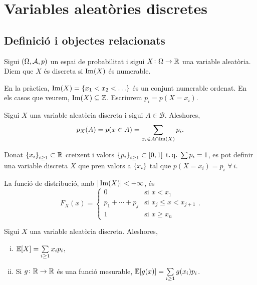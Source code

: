 \chapter{Variables aleatòries discretes}

\section{Definició i objectes relacionats}

\begin{defi}
    Sigui $\left( \Omega, \mathcal{A}, p\right)$ un espai de probabilitat i sigui $X\colon \Omega\to\mathbb{R}$ una variable aleatòria. Diem que $X$ és discreta si
    $\operatorname{Im}(X)$ és numerable.
\end{defi}

\begin{obs}
    En la pràctica, $\im(X) = \lc x_1 < x_2 < \dots \rc$ és un conjunt numerable ordenat. En els casos que veurem, $\operatorname{Im}(X)\subseteq\mathbb{Z}$.
    Escriurem $p_i = p(X=x_i)$.
\end{obs}

\begin{obs}
    Sigui $X$ una variable aleatòria discreta i sigui $A\in\mathcal{B}$. Aleshores, 
    \[
        p_X(A) = p(x\in A) = \sum_{x_i\in A\cap\operatorname{Im}\left( X\right)}{p_i}.
    \]
\end{obs}

\begin{obs}
    Donat $\left\{ x_i \right\}_{i \ge 1} \subset\mathbb{R}$ creixent i valors $\left\{ p_i \right\}_{i \ge 1} \subset [0,1] \operatorname{\;t.q.\;} \sum{p_i}=1$, es pot definir
    una variable discreta $X$ que pren valors a $\left\{ x_i \right\}$ tal que $p(X=x_i) = p_i$ $\forall\,i$.
\end{obs}

\begin{obs}
    La funció de distribució, amb $|\operatorname{Im}(X)|<+\infty$, és
    \[F_X(x) = \begin{cases}
        0 &\text{si } x<x_1\\
        p_1+\cdots+p_j &\text{si } x_j \le x < x_{j+1}\\
        1 &\text{si } x \ge x_n
    \end{cases}.\]
\end{obs}

\begin{prop} Sigui $X$ una variable aleatòria discreta. Aleshores,
    \begin{enumerate}[i)]
        \item $\operatorname{\mathbb{E}}[X] = \sum\limits_{i \ge 1}{x_i p_i}$,
        \item Si $g\colon \mathbb{R}\to\mathbb{R}$ és una funció mesurable, $\operatorname{\mathbb{E}}[g(x)] = \sum\limits_{i \ge 1}{g(x_i) p_i}$.
    \end{enumerate}
\end{prop}

